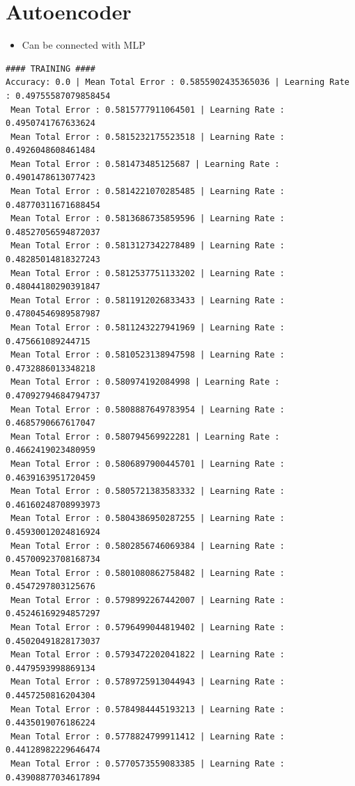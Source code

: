 \documentclass[]{report}
\begin{document}
\section{Autoencoder}
\begin{figure}[H]
\end{figure}
\begin{itemize}
\item Can be connected with MLP
\end{itemize}
\begin{verbatim}
#### TRAINING ####
Accuracy: 0.0 | Mean Total Error : 0.5855902435365036 | Learning Rate : 0.49755587079858454
 Mean Total Error : 0.5815777911064501 | Learning Rate : 0.4950741767633624
 Mean Total Error : 0.5815232175523518 | Learning Rate : 0.4926048608461484
 Mean Total Error : 0.581473485125687 | Learning Rate : 0.4901478613077423
 Mean Total Error : 0.5814221070285485 | Learning Rate : 0.48770311671688454
 Mean Total Error : 0.5813686735859596 | Learning Rate : 0.48527056594872037
 Mean Total Error : 0.5813127342278489 | Learning Rate : 0.48285014818327243
 Mean Total Error : 0.5812537751133202 | Learning Rate : 0.48044180290391847
 Mean Total Error : 0.5811912026833433 | Learning Rate : 0.47804546989587987
 Mean Total Error : 0.5811243227941969 | Learning Rate : 0.475661089244715
 Mean Total Error : 0.5810523138947598 | Learning Rate : 0.4732886013348218
 Mean Total Error : 0.580974192084998 | Learning Rate : 0.47092794684794737
 Mean Total Error : 0.5808887649783954 | Learning Rate : 0.4685790667617047
 Mean Total Error : 0.580794569922281 | Learning Rate : 0.4662419023480959
 Mean Total Error : 0.5806897900445701 | Learning Rate : 0.4639163951720459
 Mean Total Error : 0.5805721383583332 | Learning Rate : 0.46160248708993973
 Mean Total Error : 0.5804386950287255 | Learning Rate : 0.45930012024816924
 Mean Total Error : 0.5802856746069384 | Learning Rate : 0.45700923708168734
 Mean Total Error : 0.5801080862758482 | Learning Rate : 0.4547297803125676
 Mean Total Error : 0.5798992267442007 | Learning Rate : 0.45246169294857297
 Mean Total Error : 0.5796499044819402 | Learning Rate : 0.45020491828173037
 Mean Total Error : 0.5793472202041822 | Learning Rate : 0.4479593998869134
 Mean Total Error : 0.5789725913044943 | Learning Rate : 0.4457250816204304
 Mean Total Error : 0.5784984445193213 | Learning Rate : 0.4435019076186224
 Mean Total Error : 0.5778824799911412 | Learning Rate : 0.44128982229646474
 Mean Total Error : 0.5770573559083385 | Learning Rate : 0.43908877034617894

\end{verbatim}
\end{document}
